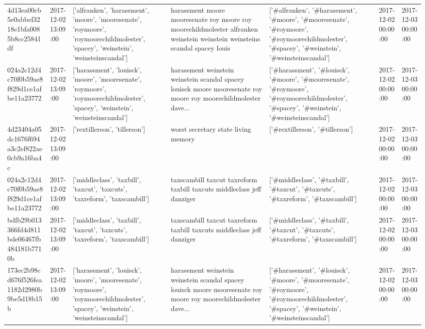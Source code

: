\begin{tabular}{lllllll}
4d13ea00cb5e0abbef3218e1bfa0085b8cc25841df & 2017-12-02 13:09:00 & ['alfranken', 'harassment', 'moore', 'mooresenate', 'roymoore', 'roymoorechildmolester', 'spacey', 'weinstein', 'weinsteinscandal'] & harassment moore mooresenate roy moore roy moorechildmolester alfranken weinstein weinstein weinsteins scandal spacey louis & ['#alfranken', '#harassment', '#moore', '#mooresenate', '#roymoore', '#roymoorechildmolester', '#spacey', '#weinstein', '#weinsteinscandal'] & 2017-12-02 00:00:00 & 2017-12-03 00:00:00 \\
024a2c12d4c70f0b59ae8f829d1ce1afbe11a23772 & 2017-12-02 13:09:00 & ['harassment', 'louisck', 'moore', 'mooresenate', 'roymoore', 'roymoorechildmolester', 'spacey', 'weinstein', 'weinsteinscandal'] & harassment weinstein weinstein scandal spacey louisck moore mooresenate roy moore roy moorechildmolester dave... & ['#harassment', '#louisck', '#moore', '#mooresenate', '#roymoore', '#roymoorechildmolester', '#spacey', '#weinstein', '#weinsteinscandal'] & 2017-12-02 00:00:00 & 2017-12-03 00:00:00 \\
4d23404a05dc1676f694a3c2ef822ae0cb9a16ba4c & 2017-12-02 13:09:00 & ['rextillerson', 'tillerson'] & worst secretary state living memory & ['#rextillerson', '#tillerson'] & 2017-12-02 00:00:00 & 2017-12-03 00:00:00 \\
024a2c12d4c70f0b59ae8f829d1ce1afbe11a23772 & 2017-12-02 13:09:00 & ['middleclass', 'taxbill', 'taxcut', 'taxcuts', 'taxreform', 'taxscambill'] & taxscambill taxcut taxreform taxbill taxcuts middleclass jeff danziger & ['#middleclass', '#taxbill', '#taxcut', '#taxcuts', '#taxreform', '#taxscambill'] & 2017-12-02 00:00:00 & 2017-12-03 00:00:00 \\
bdfb29b013366fd4d811bde06467fb484181b7710b & 2017-12-02 13:09:00 & ['middleclass', 'taxbill', 'taxcut', 'taxcuts', 'taxreform', 'taxscambill'] & taxscambill taxcut taxreform taxbill taxcuts middleclass jeff danziger & ['#middleclass', '#taxbill', '#taxcut', '#taxcuts', '#taxreform', '#taxscambill'] & 2017-12-02 00:00:00 & 2017-12-03 00:00:00 \\
173ec2b98cd676f526fea1182d2980b9be5d18b15b & 2017-12-02 13:09:00 & ['harassment', 'louisck', 'moore', 'mooresenate', 'roymoore', 'roymoorechildmolester', 'spacey', 'weinstein', 'weinsteinscandal'] & harassment weinstein weinstein scandal spacey louisck moore mooresenate roy moore roy moorechildmolester dave... & ['#harassment', '#louisck', '#moore', '#mooresenate', '#roymoore', '#roymoorechildmolester', '#spacey', '#weinstein', '#weinsteinscandal'] & 2017-12-02 00:00:00 & 2017-12-03 00:00:00 \\

\end{tabular}
